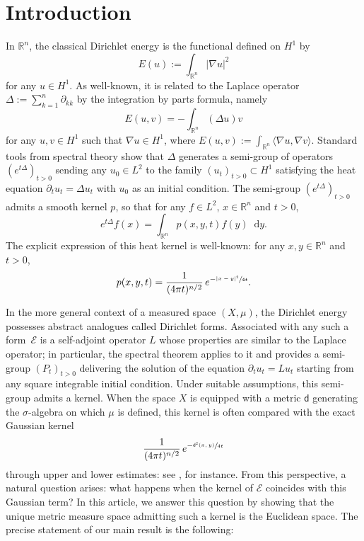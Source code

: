 \documentclass[JEP,XML,SOM,Unicode,published]{cedram}
\theoremstyle{plain}
\theoremstyle{definition}
\newcommand{\setR}{\mathbb{R}}
\newcommand{\cE}{\mathcal{E}}
\newcommand{\di}{\mathop{}\!\mathrm{d}}
\newcommand{\dist}{\mathsf{d}}
\begin{document}
\maketitle
\tableofcontents
\mainmatter

\section{Introduction}

In $\setR^n$, the classical Dirichlet energy is the functional defined on $H^1$ by
\[
E(u):= \int_{\setR^n} |\nabla u|^2
\]
for any $u \in H^1$. As well-known, it is related to the Laplace operator $\Delta:=\sum_{k=1}^{n}\partial_{kk}$ by the integration by parts formula, namely
\[
E(u,v)=-\int_{\setR^n} (\Delta u) v
\]
for any $u,v \in H^1$ such that $\nabla u\in H^1$, where $E(u,v):=\int_{\setR^n} \langle \nabla u, \nabla v\rangle$. Standard tools from spectral theory show that $\Delta$ generates a semi-group of operators $(e^{t\Delta})_{t>0}$ sending any $u_0 \in L^2$ to the family $(u_t)_{t>0}\subset H^1$ satisfying the heat equation $\partial_t u_t = \Delta u_t$ with $u_0$ as an initial condition. The semi-group $(e^{t\Delta})_{t>0}$ admits a smooth kernel $p$, so that for any $f \in L^2$, $x \in \setR^n$ and $t>0$,
\[
e^{t\Delta} f(x) = \int_{\setR^n} p(x,y,t)f(y) \di y.
\]
The explicit expression of this heat kernel is well-known: for any $x,y \in \setR^n$ and $t>0$,
\[
p(x,y,t) = \frac{1}{(4 \pi t)^{n/2}}\, e^{-\sfrac{|x-y|^2}{4t}}.
\]

In the more general context of a measured space $(X,\mu)$, the Dirichlet energy possesses abstract analogues called Dirichlet forms. Associated with any such a form~$\cE$ is a self-adjoint operator $L$ whose properties are similar to the Laplace operator; in particular, the spectral theorem applies to it and provides a semi-group $(P_t)_{t>0}$ delivering the solution of the equation $\partial_t u_t = L u_t$ starting from any square integrable initial condition. Under suitable assumptions, this semi-group admits a kernel. When the space $X$ is equipped with a metric $\dist$ generating the $\sigma$-algebra on which $\mu$ is defined, this kernel is often compared with the exact Gaussian kernel
\[
\frac{1}{(4 \pi t)^{n/2}}\, e^{-\sfrac{\dist^2(x,y)}{4t}}
\]
through upper and lower estimates: see \cite{Sturm2}, for instance. From this perspective, a natural question arises: what happens when the kernel of $\cE$ coincides with this Gaussian term? In this article, we answer this question by showing that the unique metric measure space admitting such a kernel is the Euclidean space. The precise statement of our main result is the following:
\end{document}
